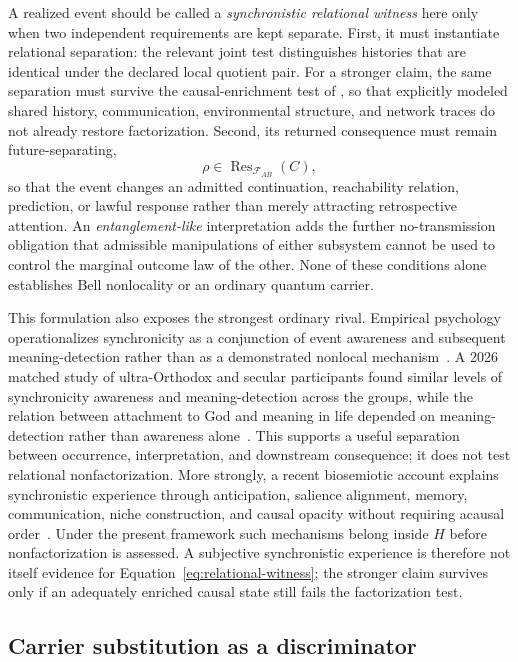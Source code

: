 \documentclass[11pt]{article}
\newcommand{\F}{\mathcal F}
\newcommand{\Res}{\operatorname{Res}}
\begin{document}
A realized event should be called a \emph{synchronistic relational witness} here only when two independent requirements are kept separate. First, it must instantiate relational separation: the relevant joint test distinguishes histories that are identical under the declared local quotient pair. For a stronger claim, the same separation must survive the causal-enrichment test of , so that explicitly modeled shared history, communication, environmental structure, and network traces do not already restore factorization. Second, its returned consequence must remain future-separating,
\begin{equation}
  \rho\in\Res_{\F_{AB}}(C),
  \label{eq:synch-residual}
\end{equation}
so that the event changes an admitted continuation, reachability relation, prediction, or lawful response rather than merely attracting retrospective attention. An \emph{entanglement-like} interpretation adds the further no-transmission obligation that admissible manipulations of either subsystem cannot be used to control the marginal outcome law of the other. None of these conditions alone establishes Bell nonlocality or an ordinary quantum carrier.

This formulation also exposes the strongest ordinary rival. Empirical psychology operationalizes synchronicity as a conjunction of event awareness and subsequent meaning-detection rather than as a demonstrated nonlocal mechanism~\cite{russonetzer2023}. A 2026 matched study of ultra-Orthodox and secular participants found similar levels of synchronicity awareness and meaning-detection across the groups, while the relation between attachment to God and meaning in life depended on meaning-detection rather than awareness alone~\cite{russonetzer2026}. This supports a useful separation between occurrence, interpretation, and downstream consequence; it does not test relational nonfactorization. More strongly, a recent biosemiotic account explains synchronistic experience through anticipation, salience alignment, memory, communication, niche construction, and causal opacity without requiring acausal order~\cite{mccoss2026}. Under the present framework such mechanisms belong inside $H$ before nonfactorization is assessed. A subjective synchronistic experience is therefore not itself evidence for Equation~\eqref{eq:relational-witness}; the stronger claim survives only if an adequately enriched causal state still fails the factorization test.

\subsection{Carrier substitution as a discriminator}
\end{document}
